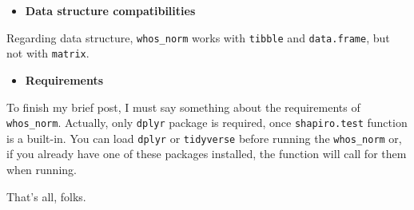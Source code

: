 \documentclass[]{article}
\providecommand{\tightlist}{%
  \setlength{\itemsep}{0pt}\setlength{\parskip}{0pt}}
\begin{document}
\begin{itemize}
\tightlist
\item
  \textbf{Data structure compatibilities}
\end{itemize}

Regarding data structure, \texttt{whos\_norm} works with \texttt{tibble}
and \texttt{data.frame}, but not with \texttt{matrix}.

\begin{itemize}
\tightlist
\item
  \textbf{Requirements}
\end{itemize}

To finish my brief post, I must say something about the requirements of
\texttt{whos\_norm}. Actually, only \texttt{dplyr} package is required,
once \texttt{shapiro.test} function is a built-in. You can load
\texttt{dplyr} or \texttt{tidyverse} before running the
\texttt{whos\_norm} or, if you already have one of these packages
installed, the function will call for them when running.

That's all, folks.
\end{document}
